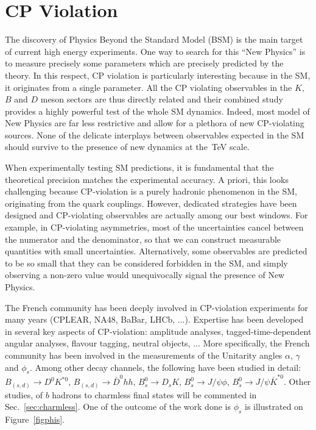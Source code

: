 

\section{CP Violation}
\label{sec:cpv}

The discovery of Physics Beyond the Standard Model (BSM) is the main target of
current high energy experiments. One way to search for this ``New Physics'' is
to measure precisely some parameters which are precisely predicted by the
theory. In this respect, CP violation is particularly interesting because in
the SM, it originates from a single parameter. All the CP violating
observables in the $K$, $B$ and $D$ meson sectors are thus directly related and
their combined study provides a highly powerful test of the whole SM dynamics.
Indeed, most model of New Physics are far less restrictive and allow for a
plethora of new CP-violating sources. None of the delicate interplays between
observables expected in the SM should survive to the presence of new dynamics
at the~TeV scale.

When experimentally testing SM predictions, it is fundamental that the
theoretical precision matches the experimental accuracy. A priori, this looks
challenging because CP-violation is a purely hadronic phenomenon in the SM,
originating from the quark couplings. However, dedicated strategies have been
designed and CP-violating observables are actually among our best windows. For
example, in CP-violating asymmetries, most of the uncertainties cancel between
the numerator and the denominator, so that we can construct measurable
quantities with small uncertainties. Alternatively, some observables are
predicted to be so small that they can be considered forbidden in the SM, and
simply observing a non-zero value would unequivocally signal the presence of
New Physics.

The French community has been deeply involved in CP-violation experiments for
many years (CPLEAR, NA48, BaBar, LHCb, ...). Expertise has been developed in
several key aspects of CP-violation: amplitude analyses, tagged-time-dependent
angular analyses, flavour tagging, neutral objects, ... More specifically, the
French community has been involved in the measurements of the Unitarity angles
$\alpha$, $\gamma$ and $\phi_{s}$. Among other decay channels, the following
have been
studied in detail:
$B_{(s,d)}\to D^{0} K^{*0}$, $B_{(s,d)}\to\bar{D}^{0} hh$, $B^{0}_{s} \to
D_{s} K$, $B^{0}_{s} \to J/\psi\phi$,
$B^{0}_{s} \to J/\psi\bar{K}^{*0}$. 
Other studies, of $b$ hadrons to charmless final states will be commented in
Sec.~\ref{sec:charmless}.
One of the outcome of the work done is
$\phi_{s}$ is illustrated on Figure~\ref{figphis}.

